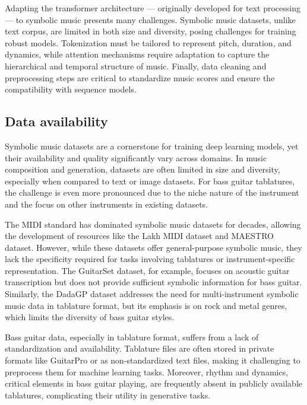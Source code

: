 Adapting the transformer architecture — originally developed for text processing — to symbolic music presents many challenges.
Symbolic music datasets, unlike text corpus, are limited in both size and diversity, posing challenges for training robust models\cite{le_natural_2024}.
Tokenization must be tailored to represent pitch, duration, and dynamics, while attention mechanisms require adaptation to capture the hierarchical and temporal structure of music.
Finally, data cleaning and preprocessing steps are critical to standardize music scores and ensure the compatibility with sequence models.


\subsection{Data availability}


Symbolic music datasets are a cornerstone for training deep learning models, yet their availability and quality significantly vary across domains.
In music composition and generation, datasets are often limited in size and diversity, especially when compared to text or image datasets.
For bass guitar tablatures, the challenge is even more pronounced due to the niche nature of the instrument and the focus on other instruments in existing datasets.


The MIDI standard has dominated symbolic music datasets for decades, allowing the development of resources like the Lakh MIDI dataset and MAESTRO dataset.
However, while these datasets offer general-purpose symbolic music, they lack the specificity required for tasks involving tablatures or instrument-specific representation.
The GuitarSet dataset, for example, focuses on acoustic guitar transcription but does not provide sufficient symbolic information for bass guitar.
Similarly, the DadaGP dataset addresses the need for multi-instrument symbolic music data in tablature format, but its emphasis is on rock and metal genres, which limits the diversity of bass guitar styles\cite{sarmento_dadagp_2021}.


Bass guitar data, especially in tablature format, suffers from a lack of standardization and availability.
Tablature files are often stored in private formats like GuitarPro or as non-standardized text files, making it challenging to preprocess them for machine learning tasks\cite{sarmento_dadagp_2021}.
Moreover, rhythm and dynamics, critical elements in bass guitar playing, are frequently absent in publicly available tablatures, complicating their utility in generative tasks.


